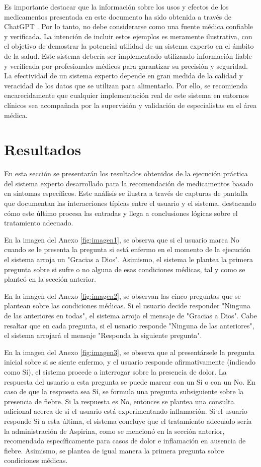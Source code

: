 \documentclass[11pt]{article}
\begin{document}
\begin{multicols}{2}
Es importante destacar que la información sobre los usos y efectos de los medicamentos presentada en este documento ha sido obtenida a través de ChatGPT \citep{chatgpt}. Por lo tanto, no debe considerarse como una fuente médica confiable y verificada. La intención de incluir estos ejemplos es meramente ilustrativa, con el objetivo de demostrar la potencial utilidad de un sistema experto en el ámbito de la salud. Este sistema debería ser implementado utilizando información fiable y verificada por profesionales médicos para garantizar su precisión y seguridad. La efectividad de un sistema experto depende en gran medida de la calidad y veracidad de los datos que se utilizan para alimentarlo. Por ello, se recomienda encarecidamente que cualquier implementación real de este sistema en entornos clínicos sea acompañada por la supervisión y validación de especialistas en el área médica.

\section{Resultados}
En esta sección se presentarán los resultados obtenidos de la ejecución práctica del sistema experto desarrollado para la recomendación de medicamentos basado en síntomas específicos. Este análisis se ilustra a través de capturas de pantalla que documentan las interacciones típicas entre el usuario y el sistema, destacando cómo este último procesa las entradas y llega a conclusiones lógicas sobre el tratamiento adecuado.

En la imagen del Anexo \ref{fig:imagen1}, se observa que si el usuario marca No cuando se le presenta la pregunta si está enfermo en el momento de la ejecución el sistema arroja un "Gracias a Dios". Asimismo, el sistema le plantea la primera pregunta sobre si sufre o no alguna de esas condiciones médicas, tal y como se planteó en la sección anterior. 

En la imagen del Anexo \ref{fig:imagen2}, se observan las cinco preguntas que se plantean sobre las condiciones médicas. Si el usuario decide responder "Ninguna de las anteriores en todas", el sistema arroja el mensaje de "Gracias a Dios". Cabe resaltar que en cada pregunta, si el usuario responde "Ninguna de las anteriores", el sistema arrojará el mensaje "Responda la siguiente pregunta". 

En la imagen del Anexo \ref{fig:imagen3}, se observa que al presentársele la pregunta inicial sobre si se siente enfermo, y el usuario responde afirmativamente (indicado como Sí), el sistema procede a interrogar sobre la presencia de dolor. La respuesta del usuario a esta pregunta se puede marcar con un Sí o con un No. En caso de que la respuesta sea Sí, se formula una pregunta subsiguiente sobre la presencia de fiebre. Si la respuesta es No, entonces se plantea una consulta adicional acerca de si el usuario está experimentando inflamación. Si el usuario responde Sí a esta última, el sistema concluye que el tratamiento adecuado sería la administración de Aspirina, como se mencionó en la sección anterior, recomendada específicamente para casos de dolor e inflamación en ausencia de fiebre. Asimismo, se plantea de igual manera la primera pregunta sobre condiciones médicas.


\end{multicols}
\end{document}
